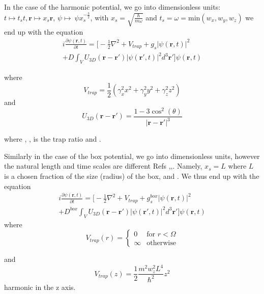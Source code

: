 \documentclass[10pt]{article}
\numberwithin{equation}{section}
\begin{document}
\begin{multicols}{2}
In the case of the harmonic potential, we go into dimensionless units: $t \mapsto t_s t, \textbf{r} \mapsto x_s\textbf{r}$, $\psi \mapsto \ \psi x_{s}^{-\frac{3}{2}}$, with $x_{s}=\sqrt{\frac{\hbar}{m\omega}}$ and $t_s=\omega = \text{min}(w_x,w_y,w_z)$ we end up with the equation
\begin{multline}
i\frac{\partial \psi(\textbf{r},t)}{\partial t}=\bigg[-\frac{1}{2}\nabla^2 + V_{trap} + g_{s}|\psi(\textbf{r},t)|^2 \\+ D \int_V U_{3D}(\textbf{r}-\textbf{r}')|\psi(\textbf{r}',t)|^2 d^3\textbf{r}' \bigg]\psi(\textbf{r},t)
\end{multline}

where
\begin{equation}
V_{trap}=\frac{1}{2}(\gamma_{x}^2 x^2+\gamma_{y}^2 y^2+\gamma_{z}^2 z^2)
\end{equation}
and
\begin{equation}
U_{3D}(\textbf{r}-\textbf{r}')=\frac{1-3 \cos^2{(\theta)}}{|\textbf{r}-\textbf{r}'|^3}
\end{equation}

where , , is the trap ratio and .

Similarly in the case of the box potential, we go into dimensionless units, however the natural length and time scales are different Refs \cite{Bao_2013},\cite{Galati_2013},\cite{Oganesov_2018}. Namely, $x_s=L$ where $L$ is a chosen fraction of the size (radius) of the box, and . We thus end up with the equation
\begin{multline}
i\frac{\partial \psi(\textbf{r},t)}{\partial t}=\bigg[-\frac{1}{2}\nabla^2 + V_{trap} + g_{s}^{box}|\psi(\textbf{r},t)|^2 \\+ D^{box} \int_V U_{3D}(\textbf{r}-\textbf{r}')|\psi(\textbf{r}',t)|^2 d^3\textbf{r}' \bigg]\psi(\textbf{r},t)
\end{multline}
where
\begin{equation*}
V_{trap}(r) = 
\begin{cases}
0 & \text{for $r<\Omega$} \\
\infty & \text{otherwise}
\end{cases}
\end{equation*}

and
\begin{equation}
V_{trap}(z)=\frac{1}{2} \frac{m^2w_{z}^2 L^4}{\hbar^2}z^2 \label{Vextbox}
\end{equation}
 harmonic in the z axis.


\end{multicols}
\end{document}
